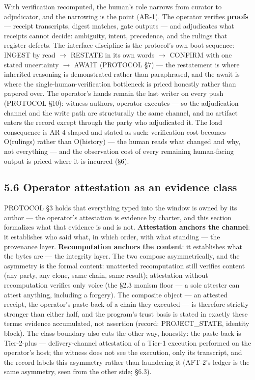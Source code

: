 \documentclass[11pt]{article}
\begin{document}
With verification recomputed, the human's role narrows from curator to adjudicator, and the narrowing is the point (AR-1). The operator verifies \textbf{proofs} --- receipt transcripts, digest matches, gate outputs --- and adjudicates what receipts cannot decide: ambiguity, intent, precedence, and the rulings that register defects. The interface discipline is the protocol's own boot sequence: INGEST by read \(\to\) RESTATE in its own words \(\to\) CONFIRM with one stated uncertainty \(\to\) AWAIT (PROTOCOL \S{}7) --- the restatement is where inherited reasoning is demonstrated rather than paraphrased, and the await is where the single-human-verification bottleneck is priced honestly rather than papered over. The operator's hands remain the last writer on every push (PROTOCOL \S{}10): witness authors, operator executes --- so the adjudication channel and the write path are structurally the same channel, and no artifact enters the record except through the party who adjudicated it. The load consequence is AR-4-shaped and stated as such: verification cost becomes O(rulings) rather than O(history) --- the human reads what changed and why, not everything --- and the observation cost of every remaining human-facing output is priced where it is incurred (\S{}6).

\subsection{5.6 Operator attestation as an evidence class}\label{operator-attestation-as-an-evidence-class}

PROTOCOL \S{}3 holds that everything typed into the window is owned by its author --- the operator's attestation is evidence by charter, and this section formalizes what that evidence is and is not. \textbf{Attestation anchors the channel}: it establishes who said what, in which order, with what standing --- the provenance layer. \textbf{Recomputation anchors the content}: it establishes what the bytes are --- the integrity layer. The two compose asymmetrically, and the asymmetry is the formal content: unattested recomputation still verifies content (any party, any clone, same chain, same result); attestation without recomputation verifies only voice (the \S{}2.3 monism floor --- a sole attester can attest anything, including a forgery). The composite object --- an attested receipt, the operator's paste-back of a chain they executed --- is therefore strictly stronger than either half, and the program's trust basis is stated in exactly these terms: evidence accumulated, not assertion (record: PROJECT\_STATE, identity block). The class boundary also cuts the other way, honestly: the paste-back is Tier-2-plus --- delivery-channel attestation of a Tier-1 execution performed on the operator's host; the witness does not see the execution, only its transcript, and the record labels this asymmetry rather than laundering it (AFT-2's ledger is the same asymmetry, seen from the other side; \S{}6.3).
\end{document}
